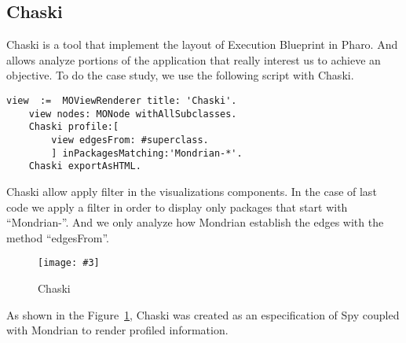 \documentclass{sig-alternate}
\newcommand{\fig}[4]{
	\begin{figure}[#1]
		\centering
		\texttt{[image: \#3]}
		\caption{\label{fig:#3}#4}
	\end{figure}}
\newcommand{\figref}[1]{Figure~\ref{fig:#1}}
\begin{document}
\subsection{Chaski}

Chaski is a tool that implement the layout of Execution Blueprint in Pharo. And allows analyze portions of the application that really interest us to achieve an objective. To do the case study, we use the following script with Chaski.

\begin{lstlisting}[language=Smalltalk]
	view  :=  MOViewRenderer title: 'Chaski'.
	view nodes: MONode withAllSubclasses.
	Chaski profile:[ 
		view edgesFrom: #superclass.
		] inPackagesMatching:'Mondrian-*'.
	Chaski exportAsHTML.
\end{lstlisting}

Chaski allow apply filter in the visualizations components. In the case of last code we apply a filter in order to display only packages that start with ``Mondrian-''. And we only analyze how Mondrian establish the edges with the method ``edgesFrom''.

\fig{}{0.3}{Chaski}{Chaski}

As shown in the \figref{Chaski}, Chaski was created as an especification of Spy coupled with Mondrian to render profiled information.





\end{document}
